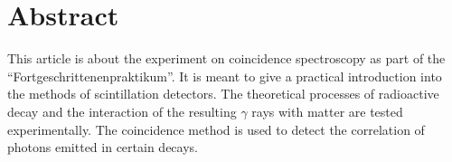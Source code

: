 \section*{Abstract}
%
This article is about the experiment on coincidence spectroscopy as part of the \enquote{Fortgeschrittenenpraktikum}.
It is meant to give a practical introduction into the methods of scintillation detectors.
The theoretical processes of radioactive decay and the interaction of the resulting $\gamma$ rays with matter are tested experimentally.
The coincidence method is used to detect the correlation of photons emitted in certain decays.
